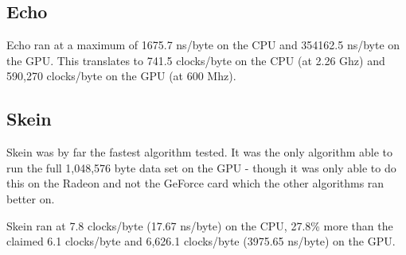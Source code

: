 \subsection*{Echo}
Echo ran at a maximum of 1675.7 ns/byte on the CPU and 354162.5 ns/byte on the GPU.
This translates to 741.5 clocks/byte on the CPU (at 2.26 Ghz) and 590,270 clocks/byte on the GPU (at 600 Mhz).

\subsection*{Skein}
Skein was by far the fastest algorithm tested.
It was the only algorithm able to run the full 1,048,576 byte data set on the GPU - though it was only able to do this on the Radeon and not the GeForce card which the other algorithms ran better on.

Skein ran at 7.8 clocks/byte (17.67 ns/byte) on the CPU, 27.8\% more than the claimed 6.1 clocks/byte and 6,626.1 clocks/byte (3975.65 ns/byte) on the GPU.